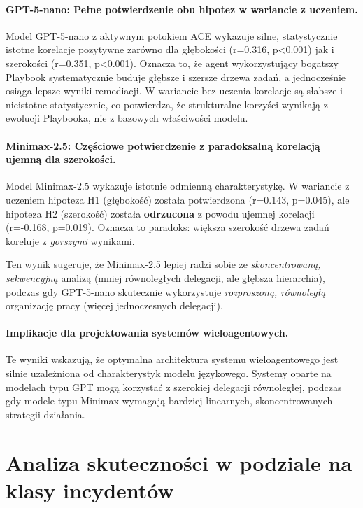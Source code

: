 \paragraph{GPT-5-nano: Pełne potwierdzenie obu hipotez w wariancie z uczeniem.}
Model GPT-5-nano z aktywnym potokiem ACE wykazuje silne, statystycznie istotne korelacje pozytywne zarówno dla głębokości (r=0.316, p<0.001) jak i szerokości (r=0.351, p<0.001). Oznacza to, że agent wykorzystujący bogatszy Playbook systematycznie buduje głębsze i szersze drzewa zadań, a jednocześnie osiąga lepsze wyniki remediacji. W wariancie bez uczenia korelacje są słabsze i nieistotne statystycznie, co potwierdza, że strukturalne korzyści wynikają z ewolucji Playbooka, nie z bazowych właściwości modelu.

\paragraph{Minimax-2.5: Częściowe potwierdzenie z paradoksalną korelacją ujemną dla szerokości.}
Model Minimax-2.5 wykazuje istotnie odmienną charakterystykę. W wariancie z uczeniem hipoteza H1 (głębokość) została potwierdzona (r=0.143, p=0.045), ale hipoteza H2 (szerokość) została \textbf{odrzucona} z powodu ujemnej korelacji (r=-0.168, p=0.019). Oznacza to paradoks: większa szerokość drzewa zadań koreluje z \emph{gorszymi} wynikami. 

Ten wynik sugeruje, że Minimax-2.5 lepiej radzi sobie ze \emph{skoncentrowaną, sekwencyjną} analizą (mniej równoległych delegacji, ale głębsza hierarchia), podczas gdy GPT-5-nano skutecznie wykorzystuje \emph{rozproszoną, równoległą} organizację pracy (więcej jednoczesnych delegacji).

\paragraph{Implikacje dla projektowania systemów wieloagentowych.}
Te wyniki wskazują, że optymalna architektura systemu wieloagentowego jest silnie uzależniona od charakterystyk modelu językowego. Systemy oparte na modelach typu GPT mogą korzystać z szerokiej delegacji równoległej, podczas gdy modele typu Minimax wymagają bardziej linearnych, skoncentrowanych strategii działania.

\section{Analiza skuteczności w podziale na klasy incydentów}

